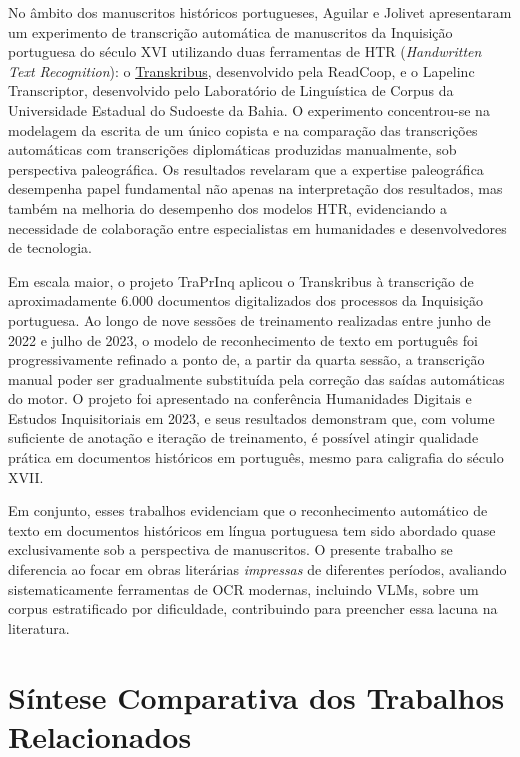\documentclass[
  12pt,
  oneside,
  a4paper,
  chapter=TITLE,
  section=TITLE,
  english,
  brazil
]{abntex2}
\begin{document}
No âmbito dos manuscritos históricos portugueses, Aguilar e Jolivet \cite{aguilar2024}
apresentaram um experimento de transcrição automática de manuscritos da Inquisição
portuguesa do século XVI utilizando duas ferramentas de HTR (\textit{Handwritten Text
Recognition}): o \href{https://www.transkribus.org}{Transkribus}, desenvolvido pela
ReadCoop, e o Lapelinc Transcriptor, desenvolvido pelo Laboratório de Linguística de
Corpus da Universidade Estadual do Sudoeste da Bahia. O experimento concentrou-se na
modelagem da escrita de um único copista e na comparação das transcrições automáticas
com transcrições diplomáticas produzidas manualmente, sob perspectiva paleográfica. Os
resultados revelaram que a expertise paleográfica desempenha papel fundamental não apenas
na interpretação dos resultados, mas também na melhoria do desempenho dos modelos HTR,
evidenciando a necessidade de colaboração entre especialistas em humanidades e
desenvolvedores de tecnologia.

Em escala maior, o projeto TraPrInq \cite{baudry2023} aplicou o Transkribus à transcrição
de aproximadamente 6.000 documentos digitalizados dos processos da Inquisição portuguesa.
Ao longo de nove sessões de treinamento realizadas entre junho de 2022 e julho de 2023,
o modelo de reconhecimento de texto em português foi progressivamente refinado a ponto
de, a partir da quarta sessão, a transcrição manual poder ser gradualmente substituída
pela correção das saídas automáticas do motor. O projeto foi apresentado na conferência
Humanidades Digitais e Estudos Inquisitoriais em 2023, e seus resultados demonstram que,
com volume suficiente de anotação e iteração de treinamento, é possível atingir qualidade
prática em documentos históricos em português, mesmo para caligrafia do século XVII.

Em conjunto, esses trabalhos evidenciam que o reconhecimento automático de texto em
documentos históricos em língua portuguesa tem sido abordado quase exclusivamente sob a
perspectiva de manuscritos. O presente trabalho se diferencia ao focar em obras literárias
\textit{impressas} de diferentes períodos, avaliando sistematicamente ferramentas de OCR
modernas, incluindo VLMs, sobre um corpus estratificado por dificuldade, contribuindo
para preencher essa lacuna na literatura.

\section{Síntese Comparativa dos Trabalhos Relacionados}
\label{sec:sintese_relacionados}
\end{document}

